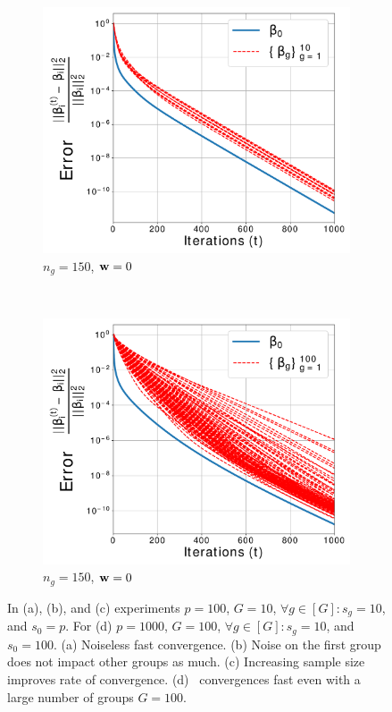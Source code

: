 \begin{figure}[t!]
	\begin{subfigure}[b]{0.2175\textwidth}
		\includegraphics[width=\textwidth]{./img/betag_converge_G10_p100_fast.pdf}
		\caption{$n_g = 150$, $\mathbf{w} = 0$} \label{fig syn2a}
	\end{subfigure} ~
	\begin{subfigure}[b]{0.2175\textwidth}
		\includegraphics[width=\textwidth]{./img/betag_converge_G100_p1000_shrink.pdf}
		\caption{$n_g = 150$, $\mathbf{w} = 0$}\label{fig syn2b}
	\end{subfigure}
	\squeezeup
	\caption{In (a), (b), and (c)  experiments $p = 100$, $G = 10$, $\forall g \in [G]: s_g = 10$, and $s_0 = p$. For (d) $p = 1000$, $G = 100$, $\forall g \in [G]: s_g = 10$, and $s_0 = 100$. (a) Noiseless fast convergence. (b) Noise on the first group does not impact other groups as much. (c) Increasing sample size improves rate of convergence. (d) \dc\ convergences fast even with a large number of groups $G=100$.}
	\label{fig syn12}
\end{figure}
